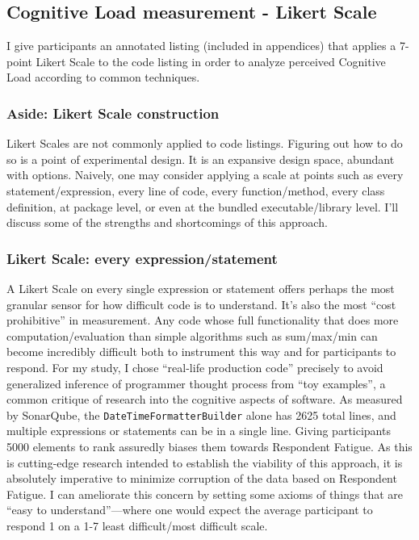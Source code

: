\subsection{Cognitive Load measurement - Likert Scale}
I give participants an annotated listing (included in appendices) that applies a 7-point Likert Scale to the code listing in order to analyze perceived Cognitive Load according to common techniques.

\subsubsection*{Aside: Likert Scale construction}
Likert Scales are not commonly applied to code listings. Figuring out how to do so is a point of experimental design.
It is an expansive design space, abundant with options. Naively, one may consider applying a scale at points such as every statement/expression, every line of code, every function/method, every class definition, at package level, or even at the bundled executable/library level. I’ll discuss some of the strengths and shortcomings of this approach.

\subsubsection*{Likert Scale: every expression/statement}
A Likert Scale on every single expression or statement offers perhaps the most granular sensor for how difficult code is to understand. It’s also the most “cost prohibitive” in measurement. Any code whose full functionality that does more computation/evaluation than simple algorithms such as sum/max/min can become incredibly difficult both to instrument this way and for participants to respond. For my study, I chose “real-life production code” precisely to avoid generalized inference of programmer thought process from “toy examples”, a common critique of research into the cognitive aspects of software. As measured by SonarQube, the \texttt{DateTimeFormatterBuilder} alone has 2625 total lines, and multiple expressions or statements can be in a single line. Giving participants 5000 elements to rank assuredly biases them towards Respondent Fatigue. As this is cutting-edge research intended to establish the viability of this approach, it is absolutely imperative to minimize corruption of the data based on Respondent Fatigue.  I can ameliorate this concern by setting some axioms of things that are “easy to understand”—where one would expect the average participant to respond 1 on a 1-7 least difficult/most difficult scale.

